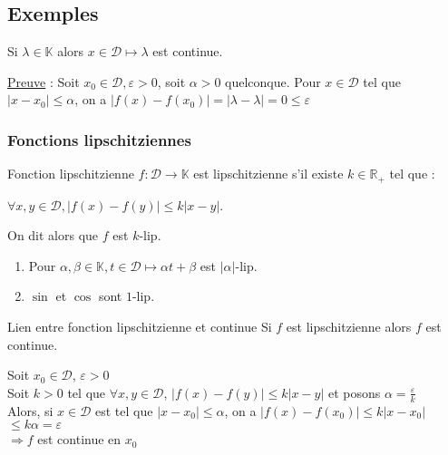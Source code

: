 \documentclass[12pt,a4paper]{report}
\begin{document}
\subsection{Exemples}
Si $\lambda \in \mathbb{K}$ alors $x \in \mathcal{D} \mapsto \lambda$ est continue.

\begin{demo}
\underline{Preuve} : Soit $x_0 \in \mathcal{D}, \varepsilon > 0$, soit $\alpha > 0$ quelconque.
\newline Pour $x \in \mathcal{D}$ tel que $\lvert x-x_0 \rvert \leq \alpha$, on a $\lvert f(x)-f(x_0) \rvert = \lvert \lambda - \lambda \rvert = 0 \leq \varepsilon$
\end{demo}


\subsubsection{Fonctions lipschitziennes}
\begin{definition}{Fonction lipschitzienne}{}
$f : \mathcal{D} \rightarrow \mathbb{K}$ est lipschitzienne s'il existe $k \in \mathbb{R}_+$ tel que :
\begin{center}
    $\forall x,y \in \mathcal{D}, \lvert f(x)-f(y) \rvert \leq k \lvert x-y \rvert$.
\end{center}

On dit alors que $f$ est $k$-lip.
\end{definition}

\begin{exemple}
\begin{enumerate}
\item Pour $\alpha,\beta \in \mathbb{K}, t \in \mathcal{D} \mapsto \alpha t + \beta$ est $\lvert \alpha \rvert$-lip.
\item $\sin$ et $\cos$ sont $1$-lip.
\end{enumerate}
\end{exemple}

\begin{proposition}{Lien entre fonction lipschitzienne et continue}{}
Si $f$ est lipschitzienne alors $f$ est continue.
\end{proposition}

\begin{demo}{}
Soit $x_0 \in \mathcal{D}$, $\varepsilon > 0$ \\
Soit $k>0$ tel que $\forall x,y \in \mathcal{D}$, $\lvert f(x)-f(y)\rvert \leq k\lvert x-y\rvert$ et posons $ \alpha = \frac{\varepsilon}{k}$\\
Alors, si $x\in \mathcal{D}$ est tel que $ \lvert x-x_0 \rvert \leq \alpha $, on a $\lvert f(x) -f(x_0) \rvert \leq k\lvert x-x_0 \rvert$ $\leq k\alpha = \varepsilon$\\
$\Longrightarrow f$ est continue en $x_0$
\end{demo}
\end{document}
